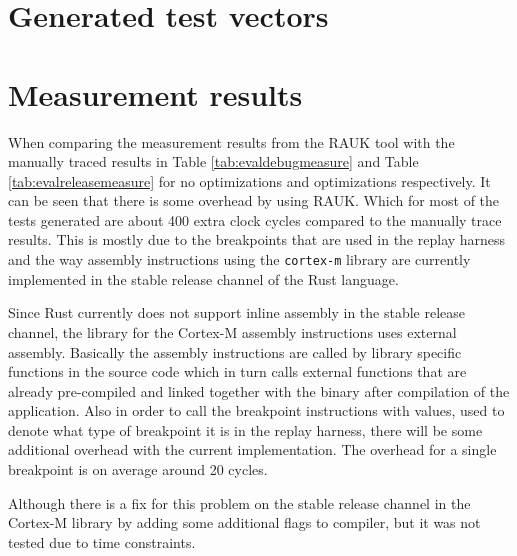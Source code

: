 
\section{Generated test vectors}

\section{Measurement results}
When comparing the measurement results from the RAUK tool with the manually
traced results in Table \ref{tab:evaldebugmeasure} and Table
\ref{tab:evalreleasemeasure} for no optimizations and optimizations
respectively. It can be seen that there is some overhead by using RAUK. Which
for most of the tests generated are about 400 extra clock cycles compared to
the manually trace results. This is mostly due to the breakpoints that are used
in the replay harness and the way assembly instructions using the
\texttt{cortex-m} library are currently implemented in the stable release
channel of the Rust language. 

Since Rust currently does not support inline assembly in the stable release
channel, the library for the Cortex-M assembly instructions uses external
assembly. Basically the assembly instructions are called by library specific
functions in the source code which in turn calls external functions that are
already pre-compiled and linked together with the binary after compilation of
the application. Also in order to call the breakpoint instructions with values,
used to denote what type of breakpoint it is in the replay harness, there will
be some additional overhead with the current implementation. The overhead for a
single breakpoint is on average around 20 cycles.

Although there is a fix for this problem on the stable release channel in the
Cortex-M library by adding some additional flags to compiler, but it was not
tested due to time constraints.

